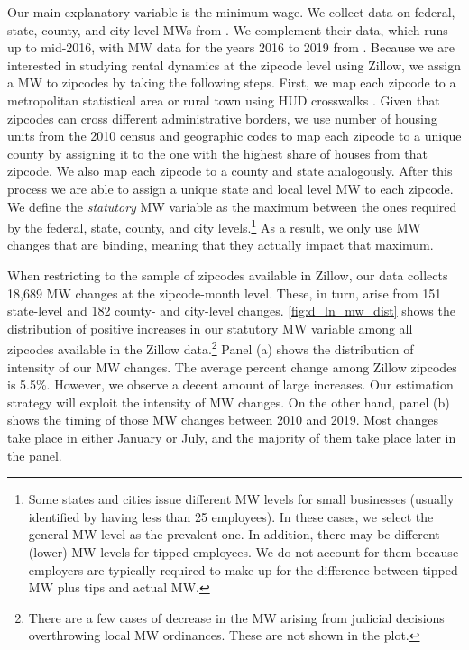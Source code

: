 Our main explanatory variable is the minimum wage. We collect data on federal, state, 
county, and city level MWs from \textcite{VaghulZipperer2016}. We complement their data,
which runs up to mid-2016, with MW data for the years 2016 to 2019 from 
\textcite{BerkeleyLaborCenter}. Because  we are interested in studying rental dynamics at 
the zipcode level using Zillow, we assign a MW to zipcodes by taking the following steps.
First, we map each zipcode to a metropolitan statistical area or rural town using HUD 
crosswalks \parencite{hudCrosswalks}. Given that zipcodes can cross different administrative
borders, we use number of housing units from the 2010 census and geographic codes to map 
each zipcode to a unique county by assigning it to the one with the highest share of houses 
from that zipcode. We also map each zipcode to a county and state analogously. After this 
process we are able to assign a unique state and local level MW to each zipcode. We define 
the \textit{statutory} MW variable as the maximum between the ones required by the federal, 
state, county, and city levels.\footnote{Some states and cities issue different MW levels 
	for small businesses (usually identified by having less than 25 employees). In these 
	cases, we select the general MW level as the prevalent one. In addition, there may be 
	different (lower) MW levels for tipped employees. We do not account for them because 
	employers are typically required to make up for the difference between tipped MW plus 
	tips and actual MW.}
As a result, we only use MW changes that are binding, meaning that they actually impact 
that maximum. 

When restricting to the sample of zipcodes available in Zillow, our data collects 18,689 
MW changes at the zipcode-month level. These, in turn, arise from 151 state-level and 182 
county- and city-level changes. \autoref{fig:d_ln_mw_dist} shows the distribution of 
positive increases in our statutory MW variable among all zipcodes available in the 
Zillow data.\footnote{There are a few cases of decrease in the MW arising from judicial 
	decisions overthrowing local MW ordinances. These are not shown in the plot.}
Panel (a) shows the distribution of intensity of our MW changes. The average percent 
change among Zillow zipcodes is 5.5\%. %
However, we observe a decent amount of large increases. Our estimation strategy will
exploit the intensity of MW changes. On the other hand, panel (b) shows the timing of 
those MW changes between 2010 and 2019. Most changes take place in either January or
July, and the majority of them take place later in the panel.

